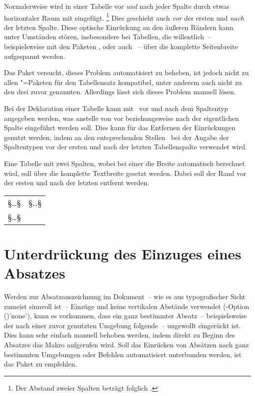 Normalerweise wird in einer Tabelle vor \emph{und} nach jeder Spalte durch 
 etwas horizontaler Raum mit  
eingefügt.%
\footnote{%
  Der Abstand zweier Spalten beträgt folglich .%
}
Dies geschieht auch \emph{vor} der ersten und \emph{nach} der letzten Spalte. 
Diese optische Einrückung an den äußeren Rändern kann unter Umständen stören, 
insbesondere bei Tabellen, die willentlich~-- beispielsweise mit den Paketen 
,  oder auch ~-- über die 
komplette Seitenbreite aufgespannt werden.

Das Paket  versucht, dieses Problem automatisiert zu 
beheben, ist jedoch nicht zu allen "=Paketen für den 
Tabellensatz kompatibel, unter anderem auch nicht zu den drei zuvor genannten. 
Allerdings lässt sich dieses Problem manuell lösen. 

Bei der Deklaration einer Tabelle kann mit~\MPValue{\dots} vor und 
nach dem Spaltentyp angegeben werden, was anstelle von  vor 
beziehungsweise nach der eigentlichen Spalte eingeführt werden soll. Dies kann 
für das Entfernen der Einrückungen genutzt werden, indem an den entsprechenden 
Stellen~ bei der Angabe der Spaltentypen vor der ersten 
und nach der letzten Tabellenspalte verwendet wird.
%
\begin{Example}
Eine Tabelle mit zwei Spalten, wobei bei einer die Breite automatisch berechnet 
wird, soll über die komplette Textbreite gesetzt werden. Dabei soll der Rand 
vor der ersten und nach der letzten entfernt werden.
\begin{Code}
\begin{tabularx}{\textwidth}{@{}lX@{}}
§\dots§ & §\dots§ \tabularnewline
§\dots§
\end{tabularx}
\end{Code}
\end{Example}



\section{%
  Unterdrückung des Einzuges eines Absatzes%
}

Werden zur Absatzauszeichnung im Dokument~-- wie es aus typografischer Sicht 
zumeist sinnvoll ist~-- Einzüge und keine vertikalen Abstände verwendet
(\KOMAScript-Option ()'none'), kann 
es vorkommen, dass ein ganz bestimmter Absatz~-- beispielsweise der nach einer 
zuvor genutzten Umgebung folgende~-- ungewollt eingerückt ist. Dies kann sehr 
einfach manuell behoben werden, indem direkt zu Beginn des Absatzes das Makro 
 aufgerufen wird. Soll das Einrücken von Absätzen nach ganz 
bestimmten Umgebungen oder Befehlen automatisiert unterbunden werden, ist das 
Paket  zu empfehlen.



